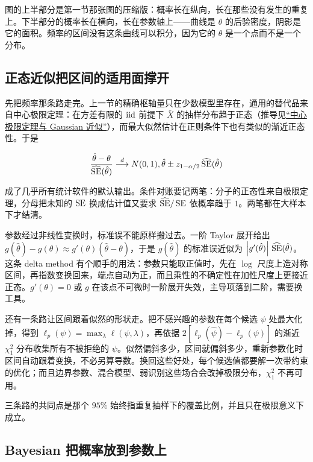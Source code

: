 图的上半部分是第一节那张图的压缩版：概率长在纵向，长在那些没有发生的重复上。下半部分的概率长在横向，长在参数轴上——曲线是 \(\theta\) 的后验密度，阴影是它的面积。频率的区间没有这条曲线可以积分，因为它的 \(\theta\) 是一个点而不是一个分布。

\subsection{正态近似把区间的适用面撑开}

先把频率那条路走完。上一节的精确枢轴量只在少数模型里存在，通用的替代品来自中心极限定理：在方差有限的 \(\mathrm{iid}\) 前提下 \(\bar X\) 的抽样分布趋于正态（推导见\hyperref[sec:05-Probability/08-Limit-Theorems/03]{``中心极限定理与 Gaussian 近似''}），而最大似然估计在正则条件下也有类似的渐近正态性。于是

\[
\frac{\hat\theta-\theta}{\widehat{\operatorname{SE}}(\hat\theta)}\overset{d}{\longrightarrow}N(0,1),
\space
\hat\theta\pm z_{1-\alpha/2}\,\widehat{\operatorname{SE}}(\hat\theta)
\]

成了几乎所有统计软件的默认输出。条件对账要记两笔：分子的正态性来自极限定理，分母把未知的 \(\operatorname{SE}\) 换成估计值又要求 \(\widehat{\operatorname{SE}}/\operatorname{SE}\) 依概率趋于 \(1\)。两笔都在大样本下才结清。

参数经过非线性变换时，标准误不能原样搬过去。一阶 Taylor 展开给出 \(g(\hat\theta)-g(\theta)\approx g'(\theta)(\hat\theta-\theta)\)，于是 \(g(\hat\theta)\) 的标准误近似为 \(\left|g'(\hat\theta)\right|\,\widehat{\operatorname{SE}}(\hat\theta)\)。这条 delta method 有个顺手的用法：参数只能取正值时，先在 \(\log\) 尺度上造对称区间，再指数变换回来，端点自动为正，而且乘性的不确定性在加性尺度上更接近正态。\(g'(\theta)=0\) 或 \(g\) 在该点不可微时一阶展开失效，主导项落到二阶，需要换工具。

还有一条路让区间跟着似然的形状走。把不感兴趣的参数在每个候选 \(\psi\) 处最大化掉，得到 \(\ell_p(\psi)=\max_\lambda\ell(\psi,\lambda)\)，再依据 \(2[\ell_p(\hat\psi)-\ell_p(\psi)]\) 的渐近 \(\chi^2_1\) 分布收集所有不被拒绝的 \(\psi\)。似然偏斜多少，区间就偏斜多少，重新参数化时区间自动跟着变换，不必另算导数。换回这些好处，每个候选值都要解一次带约束的优化；而且边界参数、混合模型、弱识别这些场合会改掉极限分布，\(\chi^2_1\) 不再可用。

三条路的共同点是那个 \(95\%\) 始终指重复抽样下的覆盖比例，并且只在极限意义下成立。

\subsection{Bayesian 把概率放到参数上}

